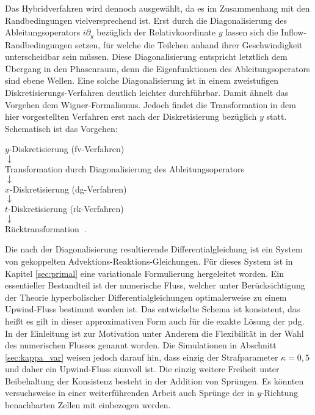 Das Hybridverfahren wird dennoch ausgewählt, da es im Zusammenhang mit den Randbedingungen vielversprechend ist. Erst durch die Diagonalisierung des Ableitungsoperators $i\partial_y$ bezüglich der Relativkoordinate $y$ lassen sich die Inflow-Randbedingungen setzen, für welche die Teilchen anhand ihrer Geschwindigkeit unterscheidbar sein müssen. Diese Diagonalisierung entspricht letztlich dem Übergang in den Phasenraum, denn die Eigenfunktionen des Ableitungsoperators sind ebene Wellen. Eine solche Diagonalisierung ist in einem zweistufigen Diskretisierungs-Verfahren deutlich leichter durchführbar. Damit ähnelt das Vorgehen dem Wigner-Formalismus. Jedoch findet die Transformation in dem hier vorgestellten Verfahren erst nach der Diskretisierung bezüglich $y$ statt. Schematisch ist das Vorgehen:
\begin{center}
    $y$-Diskretisierung (\ac{fv}-Verfahren) \\
    $\downarrow$ \\
    Transformation durch Diagonalisierung des Ableitungsoperators \\
    $\downarrow$ \\
    $x$-Diskretisierung (\ac{dg}-Verfahren) \\
    $\downarrow$ \\
    $t$-Diskretisierung (\ac{rk}-Verfahren) \\
    $\downarrow$ \\
    Rücktransformation $\; .$
\end{center}
Die nach der Diagonalisierung resultierende Differentialgleichung ist ein System von gekoppelten Advektions-Reaktions-Gleichungen. Für dieses System ist in Kapitel \ref{sec:primal} eine variationale Formulierung hergeleitet worden. Ein essentieller Bestandteil ist der numerische Fluss, welcher unter Berücksichtigung der Theorie hyperbolischer Differentialgleichungen optimalerweise zu einem Upwind-Fluss bestimmt worden ist. Das entwickelte Schema ist konsistent, das heißt es gilt in dieser approximativen Form auch für die exakte Lösung der \ac{pdg}. In der Einleitung ist zur Motivation unter Anderem die Flexibilität in der Wahl des numerischen Flusses genannt worden. Die Simulationen in Abschnitt \ref{sec:kappa_var} weisen jedoch darauf hin, dass einzig der Strafparameter $\kappa=0,5$ und daher ein Upwind-Fluss sinnvoll ist. Die einzig weitere Freiheit unter Beibehaltung der Konsistenz besteht in der Addition von Sprüngen. Es könnten versuchsweise in einer weiterführenden Arbeit auch Sprünge der in $y$-Richtung benachbarten Zellen mit einbezogen werden.

